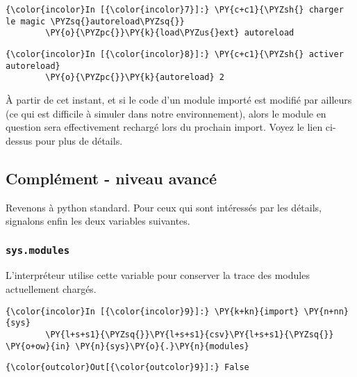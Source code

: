     \begin{Verbatim}[commandchars=\\\{\}]
{\color{incolor}In [{\color{incolor}7}]:} \PY{c+c1}{\PYZsh{} charger le magic \PYZsq{}autoreload\PYZsq{}}
        \PY{o}{\PYZpc{}}\PY{k}{load\PYZus{}ext} autoreload
\end{Verbatim}


    \begin{Verbatim}[commandchars=\\\{\}]
{\color{incolor}In [{\color{incolor}8}]:} \PY{c+c1}{\PYZsh{} activer autoreload}
        \PY{o}{\PYZpc{}}\PY{k}{autoreload} 2
\end{Verbatim}


    À partir de cet instant, et si le code d'un module importé est modifié
par ailleurs (ce qui est difficile à simuler dans notre environnement),
alors le module en question sera effectivement rechargé lors du prochain
import. Voyez le lien ci-dessus pour plus de détails.

    \hypertarget{compluxe9ment---niveau-avancuxe9}{%
\subsection{Complément - niveau
avancé}\label{compluxe9ment---niveau-avancuxe9}}

    Revenons à python standard. Pour ceux qui sont intéressés par les
détails, signalons enfin les deux variables suivantes.

    \hypertarget{sys.modules}{%
\subsubsection{\texorpdfstring{\texttt{sys.modules}}{sys.modules}}\label{sys.modules}}

    L'interpréteur utilise cette variable pour conserver la trace des
modules actuellement chargés.

    \begin{Verbatim}[commandchars=\\\{\}]
{\color{incolor}In [{\color{incolor}9}]:} \PY{k+kn}{import} \PY{n+nn}{sys}
        \PY{l+s+s1}{\PYZsq{}}\PY{l+s+s1}{csv}\PY{l+s+s1}{\PYZsq{}} \PY{o+ow}{in} \PY{n}{sys}\PY{o}{.}\PY{n}{modules}
\end{Verbatim}


\begin{Verbatim}[commandchars=\\\{\}]
{\color{outcolor}Out[{\color{outcolor}9}]:} False
\end{Verbatim}
            
